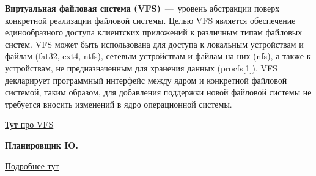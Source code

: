 \textbf{Виртуальная файловая система (VFS)}~---~уровень абстракции поверх конкретной реализации файловой системы. Целью VFS является обеспечение единообразного доступа клиентских приложений к различным типам файловых систем. VFS может быть использована для доступа к локальным устройствам и файлам (fat32, ext4, ntfs), сетевым устройствам и файлам на них (nfs), а также к устройствам, не предназначенным для хранения данных (procfs[1]). VFS декларирует программный интерфейс между ядром и конкретной файловой системой, таким образом, для добавления поддержки новой файловой системы не требуется вносить изменений в ядро операционной системы.

\href{https://russianblogs.com/article/825789153/}{Тут про VFS}

\textbf{Планировщик IO.}

\href{https://xakep.ru/2014/05/11/input-out-linux-planning/}{Подробнее тут}

